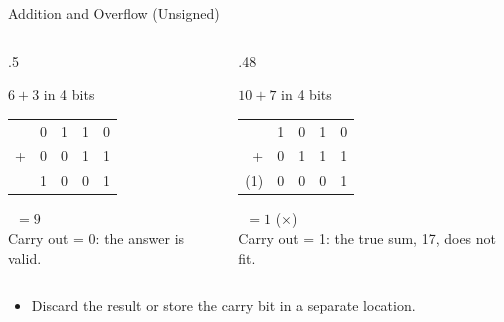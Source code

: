 \documentclass[9pt,aspectratio=169,xcolor=table]{beamer}
\begin{document}
\begin{frame}{Addition and Overflow (Unsigned)}
  \begin{columns}[t]
  \begin{column}{.5\textwidth}
    \begin{block}{$6 + 3$ in 4 bits}
      \small
      \begin{tabular}{r llll}
        & 0 & 1 & 1 & 0 \\
        + & 0 & 0 & 1 & 1 \\
        \hline
        & 1 & 0 & 0 & 1 \\
      \end{tabular}\ $= 9$ \checkmark\\
      Carry out = 0: the answer is valid.
    \end{block}
  \end{column}
  \begin{column}{.48\textwidth}
    \begin{block}{$10 + 7$ in 4 bits}
      \small
      \begin{tabular}{r llll}
        & 1 & 0 & 1 & 0 \\
        + & 0 & 1 & 1 & 1 \\
        \hline
        (1) & 0 & 0 & 0 & 1 \\
      \end{tabular}\ $= 1$ ($\times$)\\
      Carry out = 1: the true sum, 17, does not fit.
    \end{block}
  \end{column}
  \end{columns}
  \vspace{2mm}
  \begin{itemize}\small
    \item Discard the result or store the carry bit in a separate location.
  \end{itemize}
\end{frame}
\end{document}
